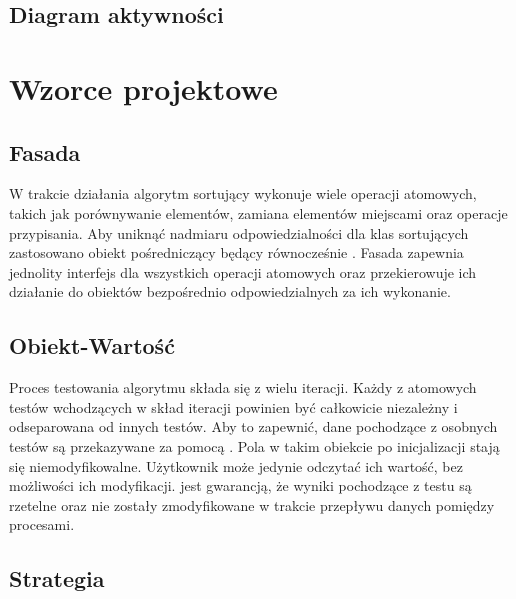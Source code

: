 \subsection{Diagram aktywności}

\section{Wzorce projektowe}

\subsection{Fasada}
W trakcie działania algorytm sortujący wykonuje wiele operacji atomowych, takich jak porównywanie
elementów, zamiana elementów miejscami oraz operacje przypisania. Aby uniknąć nadmiaru odpowiedzialności
dla klas sortujących zastosowano obiekt pośredniczący  będący równocześnie .
Fasada zapewnia jednolity interfejs dla wszystkich operacji atomowych oraz przekierowuje ich działanie
do obiektów bezpośrednio odpowiedzialnych za ich wykonanie.

\begin{figure}[H]
	\centering
	
\end{figure}

\subsection{Obiekt-Wartość}
Proces testowania algorytmu składa się z wielu iteracji. Każdy z atomowych testów wchodzących w skład
iteracji powinien być całkowicie niezależny i odseparowana od innych testów. Aby to zapewnić, dane pochodzące
z osobnych testów są przekazywane za pomocą . Pola w takim obiekcie po
inicjalizacji stają się niemodyfikowalne. Użytkownik może jedynie odczytać ich wartość, bez możliwości ich modyfikacji.  jest gwarancją, że wyniki pochodzące z testu są rzetelne oraz nie zostały
zmodyfikowane w trakcie przepływu danych pomiędzy procesami.

\begin{figure}[H]
	\centering
	
\end{figure}

\subsection{Strategia}


